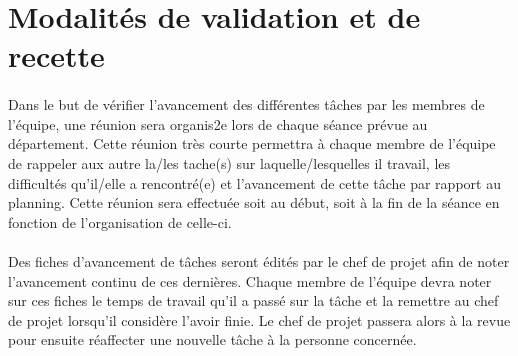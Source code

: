 \section{Modalités de validation et de recette}

\paragraph{} Dans le but de vérifier l'avancement des différentes tâches par les membres de l'équipe, une réunion sera organis2e lors de chaque séance prévue au département. Cette réunion très courte permettra à chaque membre de l'équipe de rappeler aux autre la/les tache(s) sur laquelle/lesquelles il travail, les difficultés qu'il/elle a rencontré(e) et l'avancement de cette tâche par rapport au planning. Cette réunion sera effectuée soit au début, soit à la fin de la séance en fonction de l'organisation de celle-ci.
\paragraph{} Des fiches d'avancement de tâches seront édités par le chef de projet afin de noter l'avancement continu de ces dernières. Chaque membre de l'équipe devra noter sur ces fiches le temps de travail qu'il a passé sur la tâche et la remettre au chef de projet lorsqu'il considère l'avoir finie. Le chef de projet passera alors à la revue pour ensuite réaffecter une nouvelle tâche à la personne concernée.


